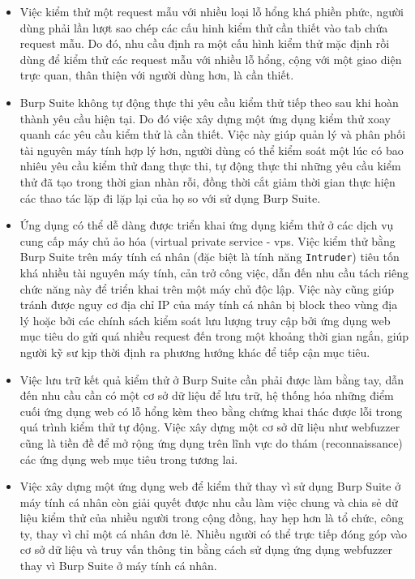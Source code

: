 \begin{itemize}
    \item Việc kiểm thử một request mẫu với nhiều loại lỗ hổng khá phiền phức, người dùng phải lần lượt sao chép các cấu hinh kiểm thử cần thiết vào tab chứa request mẫu. Do đó, nhu cầu định ra một cấu hình kiểm thử mặc định rồi dùng để kiểm thử các request mẫu với nhiều lỗ hổng, cộng với một giao diện trực quan, thân thiện với người dùng hơn, là cần thiết.
    \item Burp Suite không tự động thực thi yêu cầu kiểm thử tiếp theo sau khi hoàn thành yêu cầu hiện tại. Do đó việc xây dựng một ứng dụng kiểm thử xoay quanh các yêu cầu kiểm thử là cần thiết. Việc này giúp quản lý và phân phối tài nguyên máy tính hợp lý hơn, người dùng có thể kiểm soát một lúc có bao nhiêu yêu cầu kiểm thử đang thực thi, tự động thực thi những yêu cầu kiểm thử đã tạo trong thời gian nhàn rỗi, đồng thời cắt giảm thời gian thực hiện các thao tác lặp đi lặp lại của họ so với sử dụng Burp Suite.
    \item Ứng dụng có thể dễ dàng được triển khai ứng dụng kiểm thử ở các dịch vụ cung cấp máy chủ ảo hóa (virtual private service - \acrshort{vps}. Việc kiểm thử bằng Burp Suite trên máy tính cá nhân (đặc biệt là tính năng \texttt{Intruder}) tiêu tốn khá nhiều tài nguyên máy tính, cản trở công việc, dẫn đến nhu cầu tách riêng chức năng này để triển khai trên một máy chủ độc lập. Việc này cũng giúp tránh được nguy cơ địa chỉ IP của máy tính cá nhân bị block theo vùng địa lý hoặc bởi các chính sách kiểm soát lưu lượng truy cập bởi ứng dụng web mục tiêu do gửi quá nhiều request đến trong một khoảng thời gian ngắn, giúp người kỹ sư kịp thời định ra phương hướng khác để tiếp cận mục tiêu.
    \item Việc lưu trữ kết quả kiểm thử ở Burp Suite cần phải được làm bằng tay, dẫn đến nhu cầu cần có một cơ sở dữ liệu để lưu trữ, hệ thống hóa những điểm cuối ứng dụng web có lỗ hổng kèm theo bằng chứng khai thác được lỗi trong quá trình kiểm thử tự động. Việc xây dựng một cơ sở dữ liệu như webfuzzer cũng là tiền đề để mở rộng ứng dụng trên lĩnh vực do thám (reconnaissance) các ứng dụng web mục tiêu trong tương lai.
    \item Việc xây dựng một ứng dụng web để kiểm thử thay vì sử dụng Burp Suite ở máy tính cá nhân còn giải quyết được nhu cầu làm việc chung và chia sẻ dữ liệu kiểm thử của nhiều người trong cộng đồng, hay hẹp hơn là tổ chức, công ty, thay vì chỉ một cá nhân đơn lẻ. Nhiều người có thể trực tiếp đóng góp vào cơ sở dữ liệu và truy vấn thông tin bằng cách sử dụng ứng dụng webfuzzer thay vì Burp Suite ở máy tính cá nhân.
\end{itemize}